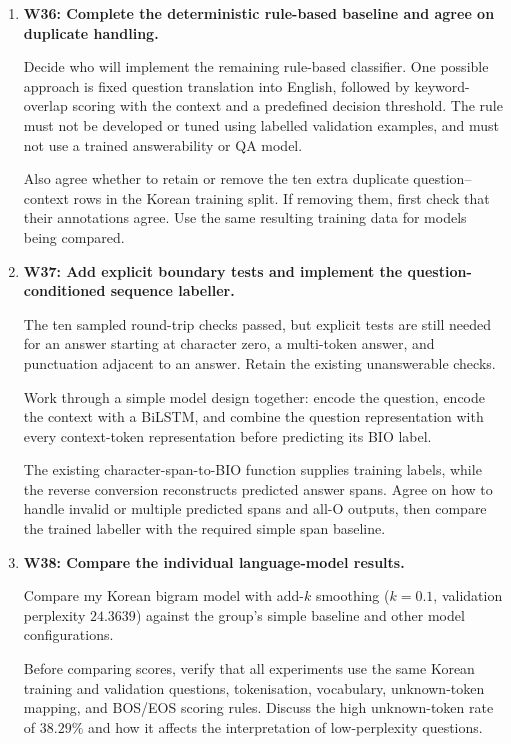 \documentclass[11pt,a4paper]{article}
\begin{document}
\begin{enumerate}[leftmargin=*,itemsep=8pt]

\item \textbf{W36: Complete the deterministic rule-based baseline
and agree on duplicate handling.}

Decide who will implement the remaining rule-based classifier.
One possible approach is fixed question translation into English,
followed by keyword-overlap scoring with the context and a
predefined decision threshold. The rule must not be developed
or tuned using labelled validation examples, and must not use
a trained answerability or QA model.

Also agree whether to retain or remove the ten extra duplicate
question--context rows in the Korean training split.
If removing them, first check that their annotations agree.
Use the same resulting training data for models being compared.

\item \textbf{W37: Add explicit boundary tests and implement
the question-conditioned sequence labeller.}

The ten sampled round-trip checks passed, but explicit tests
are still needed for an answer starting at character zero,
a multi-token answer, and punctuation adjacent to an answer.
Retain the existing unanswerable checks.

Work through a simple model design together: encode the question,
encode the context with a BiLSTM, and combine the question
representation with every context-token representation before
predicting its BIO label.

The existing character-span-to-BIO function supplies training
labels, while the reverse conversion reconstructs predicted
answer spans. Agree on how to handle invalid or multiple
predicted spans and all-O outputs, then compare the trained
labeller with the required simple span baseline.

\item \textbf{W38: Compare the individual language-model results.}

Compare my Korean bigram model with add-$k$ smoothing
($k=0.1$, validation perplexity $24.3639$)
against the group's simple baseline and other model configurations.

Before comparing scores, verify that all experiments use the
same Korean training and validation questions, tokenisation,
vocabulary, unknown-token mapping, and BOS/EOS scoring rules.
Discuss the high unknown-token rate of $38.29\%$ and how it
affects the interpretation of low-perplexity questions.


\end{enumerate}
\end{document}
